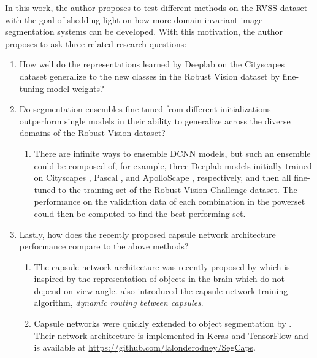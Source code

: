 \documentclass[10pt,twocolumn,letterpaper]{article}
\begin{document}
In this work, the author proposes to test different methods on the RVSS dataset with the goal of shedding light on
how more domain-invariant image segmentation systems can be developed. With this motivation, the author proposes to ask three related research questions:
\begin{enumerate}
\item How well do the representations learned by Deeplab on the Cityscapes dataset generalize to the new classes in the Robust Vision dataset by fine-tuning model weights?
\item Do segmentation ensembles fine-tuned from different initializations outperform single models in their ability to generalize across the diverse domains of the Robust Vision dataset?
\begin{enumerate}
  \item There are infinite ways to ensemble DCNN models, but such an ensemble could be composed of, for example,
  three Deeplab models initially trained on Cityscapes \cite{cordts2016cityscapes}, Pascal \cite{everingham2010pascal}, and ApolloScape \cite{huang2018apolloscape}, respectively,
  and then all fine-tuned to the training set of the Robust Vision Challenge dataset. The performance on the validation data of each combination in the powerset could then be computed to find the best performing set.
\end{enumerate}
\item Lastly, how does the recently proposed capsule network architecture \cite{sabour2017dynamic} performance compare to the above methods?
\begin{enumerate}
  \item The capsule network architecture was recently proposed by \citet{sabour2017dynamic} which is inspired by the representation of objects
  in the brain which do not depend on view angle. \citet{sabour2017dynamic} also introduced the capsule network training algorithm, \textit{dynamic routing between capsules}.
  \item Capsule networks were quickly extended to object segmentation by \citet{lalonde2018capsules}. Their network architecture is implemented in
    Keras and TensorFlow and is available at \href{https://github.com/lalonderodney/SegCaps}{https://github.com/lalonderodney/SegCaps}.
\end{enumerate}
\end{enumerate}
\end{document}
